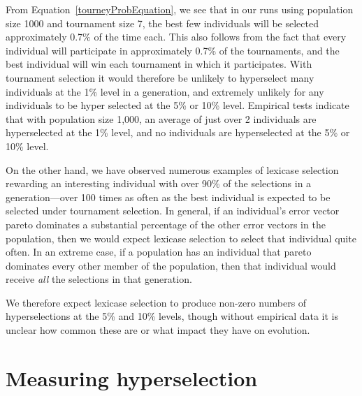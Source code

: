 \documentclass{sig-alternate}
\begin{document}
From Equation~\ref{tourneyProbEquation}, we see that in our runs using population size 1000 and tournament size 7, the best few individuals will be selected approximately 0.7\% of the time each. This also follows from the fact that every individual will participate in approximately 0.7\% of the tournaments, and the best individual will win each tournament in which it participates.
With tournament selection it would therefore be unlikely to hyperselect many individuals at the 1\% level in a generation, and extremely unlikely for any individuals to be hyper selected at the 5\% or 10\% level. Empirical tests indicate that with population size 1,000, an average of just over 2 individuals are hyperselected at the 1\% level, and no individuals are hyperselected at the 5\% or 10\% level.

On the other hand, we have observed numerous examples of lexicase selection rewarding an interesting individual with over 90\% of the selections in a generation---over 100 times as often as the best individual is expected to be selected under tournament selection. In general, if an individual's error vector pareto dominates a substantial percentage of the other error vectors in the population, then we would expect lexicase selection to select that individual quite often. In an extreme case, if a population has an individual that pareto dominates every other member of the population, then that individual would receive \emph{all} the selections in that generation.

We therefore expect lexicase selection to produce non-zero numbers of hyperselections at the 5\% and 10\% levels, though without empirical data it is unclear how common these are or what impact they have on evolution.

\section{Measuring hyperselection}
\label{section:experiments}
\end{document}
